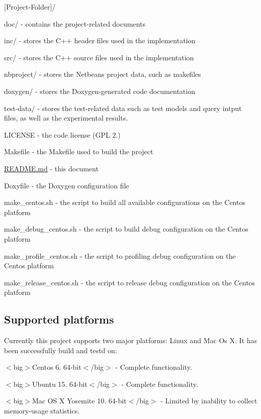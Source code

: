 \begin{DoxyItemize}
\item \mbox{[}Project-\/\+Folder\mbox{]}/
\begin{DoxyItemize}
\item doc/ -\/ contains the project-\/related documents
\item inc/ -\/ stores the C++ header files used in the implementation
\item src/ -\/ stores the C++ source files used in the implementation
\item nbproject/ -\/ stores the Netbeans project data, such as makefiles
\item doxygen/ -\/ stores the Doxygen-\/generated code documentation
\item test-\/data/ -\/ stores the test-\/related data such as test models and query intput files, as well as the experimental results.
\item L\+I\+C\+E\+N\+S\+E -\/ the code license (G\+P\+L 2.)
\item Makefile -\/ the Makefile used to build the project
\item \hyperlink{_r_e_a_d_m_e_8md}{R\+E\+A\+D\+M\+E.\+md} -\/ this document
\item Doxyfile -\/ the Doxygen configuration file
\item make\+\_\+centos.\+sh -\/ the script to build all available configurations on the Centos platform
\item make\+\_\+debug\+\_\+centos.\+sh -\/ the script to build debug configuration on the Centos platform
\item make\+\_\+profile\+\_\+centos.\+sh -\/ the script to profiling debug configuration on the Centos platform
\item make\+\_\+release\+\_\+centos.\+sh -\/ the script to release debug configuration on the Centos platform
\end{DoxyItemize}
\end{DoxyItemize}

\subsection*{Supported platforms}

Currently this project supports two major platforms\+: Linux and Mac Os X. It has been successfully build and testd on\+:


\begin{DoxyItemize}
\item $<$big$>$Centos 6. 64-\/bit$<$/big$>$ -\/ Complete functionality.
\item $<$big$>$Ubuntu 15. 64-\/bit$<$/big$>$ -\/ Complete functionality.
\item $<$big$>$Mac O\+S X Yosemite 10. 64-\/bit$<$/big$>$ -\/ Limited by inability to collect memory-\/usage statistics.
\end{DoxyItemize}

